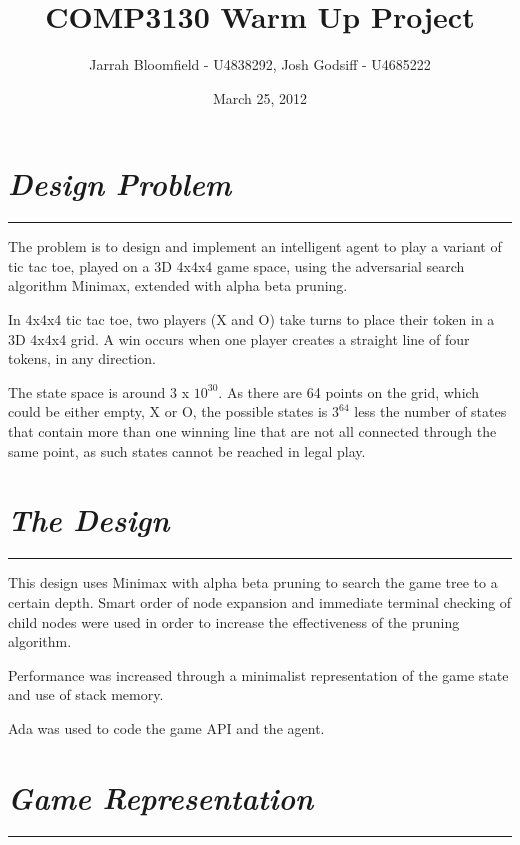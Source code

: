 \documentclass[10pt]{report}
\begin{document}
\title{COMP3130 Warm Up Project}
\date{March 25, 2012}
\author{Jarrah Bloomfield - U4838292, Josh Godsiff - U4685222}
\maketitle

\setlength{\columnsep}{22.0pt}
\begin{multicols}{2}

\section*{\emph{Design Problem}}
\hrule
\vspace{0.4cm}

The problem is to design and implement an intelligent agent to play a variant of tic tac toe, played on a 3D 4x4x4 game space, using the adversarial search algorithm Minimax, extended with alpha beta pruning.

In 4x4x4 tic tac toe, two players (X and O) take turns to place their token in a 3D 4x4x4 grid. A win occurs when one player creates a straight line of four tokens, in any direction.

The state space is around 3 x $10^{30}$. As there are 64 points on the grid, which could be either empty, X or O, the possible states is $3^{64}$ less the number of states that contain more than one winning line that are not all connected through the same point, as such states cannot be reached in legal play.

\section*{\emph{{The Design}}}
\hrule
\vspace{0.4cm}

This design uses Minimax with alpha beta pruning to search the game tree to a certain depth. Smart order of node expansion and immediate terminal checking of child nodes were used in order to increase the effectiveness of the pruning algorithm.

Performance was increased through a minimalist representation of the game state and use of stack memory.

Ada was used to code the game API and the agent.

\section*{\emph{\textmd{Game Representation}}}
\hrule
\vspace{0.4cm}


\end{multicols}
\end{document}
